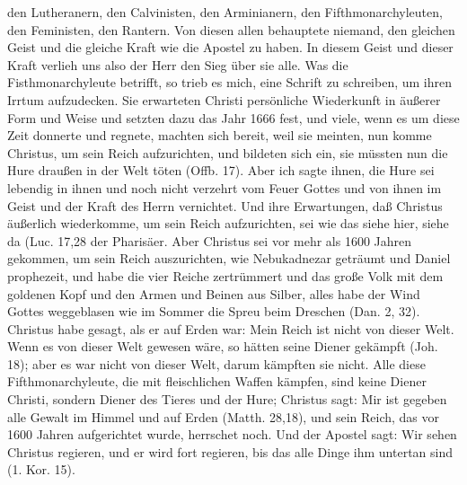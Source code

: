 den Lutheranern,
den Calvinisten, 
den Arminianern, 
den Fifthmonarchyleuten, 
den Feministen, 
den Rantern. 
Von diesen allen behauptete niemand,
den gleichen Geist und die gleiche Kraft wie die Apostel zu haben.
In diesem Geist und dieser Kraft verlieh uns also der Herr den
Sieg über sie alle. Was die Fisthmonarchyleute betrifft, so trieb
es mich, eine Schrift zu schreiben, um ihren Irrtum aufzudecken.
Sie erwarteten Christi persönliche Wiederkunft in äußerer Form
und Weise und setzten dazu das Jahr 1666 fest, und viele, wenn
es um diese Zeit donnerte und regnete, machten sich bereit, weil
sie meinten, nun komme Christus, um sein Reich aufzurichten,
und bildeten sich ein, sie müssten nun die Hure draußen in der
Welt töten (Offb. 17). Aber ich sagte ihnen, 
die Hure sei lebendig
in ihnen und noch nicht verzehrt vom Feuer Gottes und von
ihnen im Geist und der Kraft des Herrn vernichtet. Und ihre
Erwartungen, daß Christus äußerlich wiederkomme, um sein Reich
aufzurichten, sei wie das \glqq siehe hier, siehe da\grqq{} (Luc. 
17,28 der
Pharisäer. Aber Christus sei vor mehr als 1600 Jahren gekommen, 
um sein Reich auszurichten, wie Nebukadnezar 
geträumt und Daniel prophezeit, und 
habe die vier Reiche zertrümmert und
das große Volk mit dem goldenen Kopf und den Armen und
Beinen aus Silber, alles habe der Wind Gottes weggeblasen
wie im Sommer die Spreu beim Dreschen (Dan. 2, 32).
Christus habe gesagt, als er auf Erden war: \glqq Mein Reich ist
nicht von dieser Welt.\grqq{} Wenn es von dieser Welt gewesen wäre,
so hätten seine Diener gekämpft (Joh. 18); aber es war nicht
von dieser Welt, darum kämpften sie nicht. Alle diese 
Fifthmonarchyleute, die mit fleischlichen Waffen kämpfen, sind keine
Diener Christi, sondern Diener des Tieres und der Hure; Christus
sagt: \glqq Mir ist gegeben alle Gewalt im Himmel und auf Erden\grqq{}
(Matth. 28,18), und sein Reich, das vor 
1600 Jahren aufgerichtet  wurde, herrschet noch. Und der Apostel sagt: 
\glqq Wir sehen Christus regieren, und er wird fort regieren, 
bis das alle Dinge ihm untertan sind\grqq{} (1. Kor. 15).

